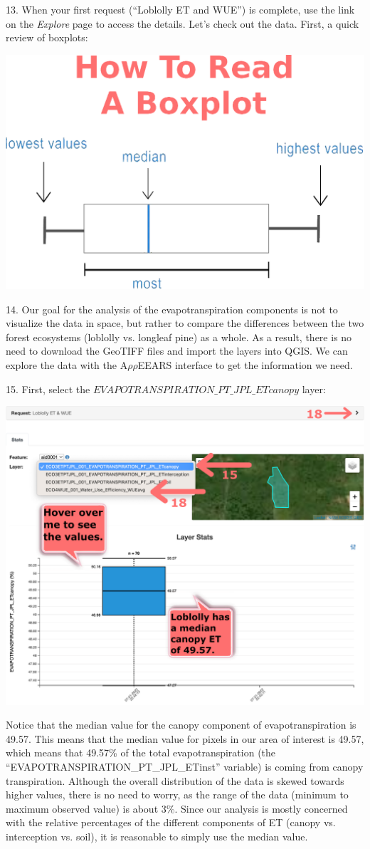 \documentclass[oneside,a4paper,11pt,explicit]{book}
\begin{document}
13. When your first request (``Loblolly ET and WUE'') is complete, use the link on the \textit{Explore} page to access the details. Let's check out the data. First, a quick review of boxplots:

\vspace{1em}

\centerline{\includegraphics[width=.45\textwidth]{HowToBoxplot.png}}

\vspace{.5em}

14. Our goal for the analysis of the evapotranspiration components is not to visualize the data in space, but rather to compare the differences between the two forest ecosystems (loblolly vs. longleaf pine) as a whole. As a result, there is no need to download the GeoTIFF files and import the layers into QGIS. We can explore the data with the A$\rho\rho$EEARS interface to get the information we need.

15. First, select the $EVAPOTRANSPIRATION\_PT\_JPL\_ETcanopy$ layer:

\vspace{.5em}

\centerline{\includegraphics[width=.6\textwidth]{ETComponents.png}}

\vspace{.5em}

Notice that the median value for the canopy component of evapotranspiration is 49.57. This means that the median value for pixels in our area of interest is 49.57, which means that 49.57\% of the total evapotranspiration (the ``EVAPOTRANSPIRATION\_PT\_JPL\_ETinst'' variable) is coming from canopy transpiration. Although the overall distribution of the data is skewed towards higher values, there is no need to worry, as the range of the data (minimum to maximum observed value) is about 3\%. Since our analysis is mostly concerned with the relative percentages of the different components of ET (canopy vs. interception vs. soil), it is reasonable to simply use the median value.
\end{document}
